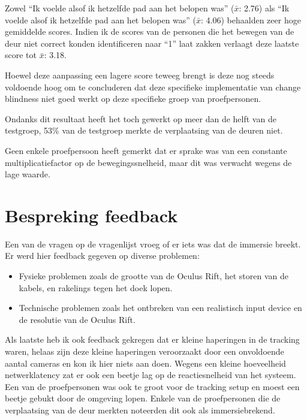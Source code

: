 Zowel ``Ik voelde alsof ik hetzelfde pad aan het belopen was'' ($\bar{x}$: 2.76)
als ``Ik voelde alsof ik hetzelfde pad aan het belopen was'' ($\bar{x}$: 4.06)
behaalden zeer hoge gemiddelde scores. Indien ik de scores van de personen die
het bewegen van de deur niet correct konden identificeren naar ``1'' laat zakken
verlaagt deze laatste score tot $\bar{x}$: 3.18.

Hoewel deze aanpassing een lagere score teweeg brengt is deze nog steeds
voldoende hoog om te concluderen dat deze specifieke implementatie van
change blindness niet goed werkt op deze specifieke groep van proefpersonen.

Ondanks dit resultaat heeft het toch gewerkt op meer dan de helft van de
testgroep, 53\% van de testgroep merkte de verplaatsing van de deuren niet.

Geen enkele proefpersoon heeft gemerkt dat er sprake was van een constante
multiplicatiefactor op de bewegingssnelheid, maar dit was verwacht wegens de lage
waarde\cite{steinicke09}.


\section{Bespreking feedback}
Een van de vragen op de vragenlijst vroeg of er iets was dat de immersie breekt.
Er werd hier feedback gegeven op diverse problemen:

\begin{itemize}
  \item Fysieke problemen zoals de grootte van de Oculus Rift, het storen van de
        kabels, en rakelings tegen het doek lopen.
  \item Technische problemen zoals het ontbreken van een realistisch input device
        en de resolutie van de Oculus Rift.
\end{itemize}

Als laatste heb ik ook feedback gekregen dat er kleine haperingen in de tracking
waren, helaas zijn deze kleine haperingen veroorzaakt door een onvoldoende aantal
cameras en kon ik hier niets aan doen. Wegens een kleine hoeveelheid 
netwerklatency zat er ook een beetje lag op de reactiesnelheid van het systeem. 
Een van de proefpersonen was ook te groot voor de tracking setup en moest een
beetje gebukt door de omgeving lopen. Enkele van de proefpersonen die de 
verplaatsing van de deur merkten noteerden dit ook als immersiebrekend.